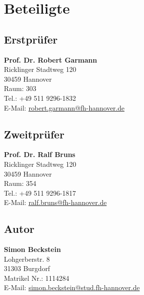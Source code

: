 \chapter*{Beteiligte}
\begin{minipage}{\textwidth}

	\section*{Erstprüfer}
	\textbf{Prof. Dr. Robert Garmann}\\
	Ricklinger Stadtweg 120\\
	30459  Hannover\\
	
	Raum: 303\\
	Tel.: +49 511 9296-1832\\
	E-Mail: \href{mailto:robert.garmann@fh-hannover.de}{robert.garmann@fh-hannover.de}
	
	\section*{Zweitprüfer}
	\textbf{Prof. Dr. Ralf Bruns}\\
	Ricklinger Stadtweg 120\\
	30459  Hannover\\
	
	Raum: 354\\
	Tel.: +49 511 9296-1817\\
	E-Mail: \href{mailto:ralf.bruns@fh-hannover.de}{ralf.bruns@fh-hannover.de}
	
	
	\section*{Autor}
	\textbf{Simon Beckstein}\\
	Lohgerberstr. 8\\
	31303 Burgdorf\\
	
	Matrikel Nr.: 1114284\\
	E-Mail: \href{mailto:simon.beckstein@stud.fh-hannover.de}{simon.beckstein@stud.fh-hannover.de}
\end{minipage}



